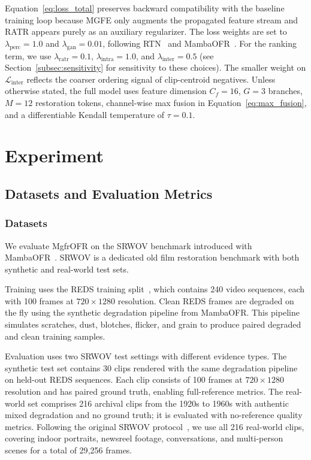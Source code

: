 \documentclass[symmetry,article,submit,pdftex,moreauthors]{Definitions/mdpi}
\begin{document}
Equation~\eqref{eq:loss_total} preserves backward compatibility with the baseline training loop because MGFE only augments the propagated feature stream and RATR appears purely as an auxiliary regularizer. The loss weights are set to $\lambda_{\mathrm{perc}}=1.0$ and $\lambda_{\mathrm{gan}}=0.01$, following RTN~\cite{wan2022rtn} and MambaOFR~\cite{mao2025mambaofr}. For the ranking term, we use $\lambda_{\mathrm{ratr}}=0.1$, $\lambda_{\mathrm{intra}}=1.0$, and $\lambda_{\mathrm{inter}}=0.5$ (see Section~\ref{subsec:sensitivity} for sensitivity to these choices). The smaller weight on $\mathcal{L}_{\text{inter}}$ reflects the coarser ordering signal of clip-centroid negatives. Unless otherwise stated, the full model uses feature dimension $C_f=16$, $G=3$ branches, $M=12$ restoration tokens, channel-wise max fusion in Equation~\eqref{eq:max_fusion}, and a differentiable Kendall temperature of $\tau=0.1$.
\section{Experiment}
\label{sec:experiment}

\subsection{Datasets and Evaluation Metrics}
\label{subsec:datasets_metrics}

\subsubsection{Datasets}
\label{subsec:datasets}

We evaluate MgfrOFR on the SRWOV benchmark introduced with MambaOFR~\cite{mao2025mambaofr}. SRWOV is a dedicated old film restoration benchmark with both synthetic and real-world test sets.

Training uses the REDS training split~\cite{nah2019reds}, which contains 240 video sequences, each with 100 frames at $720 \times 1280$ resolution. Clean REDS frames are degraded on the fly using the synthetic degradation pipeline from MambaOFR. This pipeline simulates scratches, dust, blotches, flicker, and grain to produce paired degraded and clean training samples.

Evaluation uses two SRWOV test settings with different evidence types. The synthetic test set contains 30 clips rendered with the same degradation pipeline on held-out REDS sequences. Each clip consists of 100 frames at $720 \times 1280$ resolution and has paired ground truth, enabling full-reference metrics. The real-world set comprises 216 archival clips from the 1920s to 1960s with authentic mixed degradation and no ground truth; it is evaluated with no-reference quality metrics. Following the original SRWOV protocol~\cite{mao2025mambaofr}, we use all 216 real-world clips, covering indoor portraits, newsreel footage, conversations, and multi-person scenes for a total of 29{,}256 frames.
\end{document}
